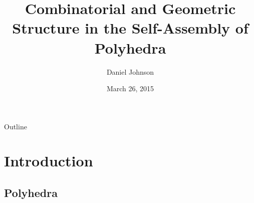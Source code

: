 \documentclass{beamer}
\title{Combinatorial and Geometric Structure in the Self-Assembly of Polyhedra}
\author{Daniel Johnson}
\date{March 26, 2015}
\begin{document}

\frame{\titlepage}

\section[Outline]{}
\begin{frame}{Outline}
  \tableofcontents
\end{frame}
\section{Introduction}
\subsection{Polyhedra}
\end{document}
